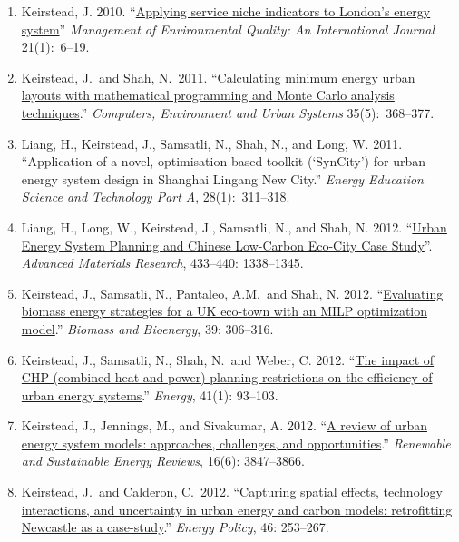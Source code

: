 \documentclass[11pt,a4paper]{article}
\newcommand{\flag}{\marginpar{\hfill\raisebox{-2pt}{*}}}
\begin{document}
\begin{enumerate}
\item Keirstead, J. 2010. ``\href{http://dx.doi.org/10.1108/14777831011010829}{Applying service niche indicators to London's energy system}'' \emph{Management of Environmental Quality: An International Journal} 21(1):~6--19.

\item Keirstead, J.\  and Shah, N.\flag\ 2011. ``\href{http://dx.doi.org/10.1016/j.compenvurbsys.2010.12.005}{Calculating minimum energy urban layouts with mathematical programming and Monte Carlo analysis techniques}.'' \emph{Computers, Environment and Urban Systems} 35(5):~368--377. 

\item Liang, H., Keirstead, J., Samsatli, N., Shah, N., and Long, W. 2011. ``Application of a novel, optimisation-based toolkit (`SynCity') for urban energy system design in Shanghai Lingang New City.'' \emph{Energy Education Science and Technology Part A}, 28(1):~311--318.

\item Liang, H., Long, W., Keirstead, J., Samsatli, N., and Shah, N. 2012. ``\href{http://dx.doi.org/10.4028/www.scientific.net/AMR.433-440.1338}{Urban Energy System Planning and Chinese Low-Carbon Eco-City Case Study}''. \emph{Advanced Materials Research}, 433--440: 1338--1345. 

\item Keirstead, J., Samsatli, N., Pantaleo, A.M.\, and Shah, N. 2012. ``\href{http://dx.doi.org/10.1016/j.biombioe.2012.01.022}{Evaluating biomass energy strategies for a UK eco-town with an MILP optimization model}.'' \emph{Biomass and Bioenergy}, 39: 306--316.

\item Keirstead, J., Samsatli, N., Shah, N.\  and Weber, C. 2012. ``\href{http://dx.doi.org/10.1016/j.energy.2011.06.011}{The impact of CHP (combined heat and power) planning restrictions on the efficiency of urban energy systems}.'' \emph{Energy}, 41(1): 93--103.

\item Keirstead, J., Jennings, M., and Sivakumar, A. 2012. ``\href{http://dx.doi.org/10.1016/j.rser.2012.02.047}{A review of urban energy system models: approaches, challenges, and opportunities}.'' \emph{Renewable and Sustainable Energy Reviews}, 16(6): 3847--3866.

\item Keirstead, J.\  and Calderon, C.\flag\  2012. ``\href{http://dx.doi.org/10.1016/j.enpol.2012.03.058}{Capturing spatial effects, technology interactions, and uncertainty in urban energy and carbon models: retrofitting Newcastle as a case-study}.''  \emph{Energy Policy}, 46: 253--267.


\end{enumerate}
\end{document}
